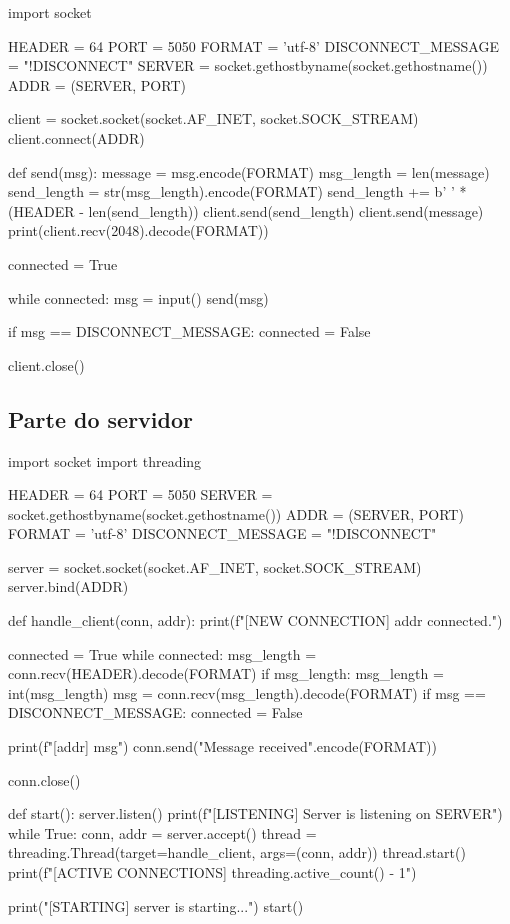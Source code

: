 	\begin{pycode}
		import socket
		
		HEADER = 64
		PORT = 5050
		FORMAT = 'utf-8'
		DISCONNECT_MESSAGE = "!DISCONNECT"
		SERVER = socket.gethostbyname(socket.gethostname())
		ADDR = (SERVER, PORT)
		
		client = socket.socket(socket.AF_INET, socket.SOCK_STREAM)
		client.connect(ADDR)
		
		def send(msg):
		message = msg.encode(FORMAT)
		msg_length = len(message)
		send_length = str(msg_length).encode(FORMAT)
		send_length += b' ' * (HEADER - len(send_length))
		client.send(send_length)
		client.send(message)
		print(client.recv(2048).decode(FORMAT))
		
		connected = True
		
		while connected:
		msg = input()
		send(msg)
		
		if msg == DISCONNECT_MESSAGE:
		connected = False
		
		client.close()
	\end{pycode}
	
	\subsection*{Parte do servidor}
	
	\begin{pycode}
		import socket
		import threading
		
		HEADER = 64
		PORT = 5050
		SERVER = socket.gethostbyname(socket.gethostname())
		ADDR = (SERVER, PORT)
		FORMAT = 'utf-8'
		DISCONNECT_MESSAGE = "!DISCONNECT"
		
		server = socket.socket(socket.AF_INET, socket.SOCK_STREAM)
		server.bind(ADDR)
		
		def handle_client(conn, addr):
		print(f"[NEW CONNECTION] {addr} connected.")
		
		connected = True
		while connected:
		msg_length = conn.recv(HEADER).decode(FORMAT)
		if msg_length:
		msg_length = int(msg_length)
		msg = conn.recv(msg_length).decode(FORMAT)
		if msg == DISCONNECT_MESSAGE:
		connected = False
		
		print(f"[{addr}] {msg}")
		conn.send("Message received".encode(FORMAT))
		
		conn.close()
		
		def start():
		server.listen()
		print(f"[LISTENING] Server is listening on {SERVER}")
		while True:
		conn, addr = server.accept()
		thread = threading.Thread(target=handle_client, args=(conn, addr))
		thread.start()
		print(f"[ACTIVE CONNECTIONS] {threading.active_count() - 1}")
		
		print("[STARTING] server is starting...")
		start()
	\end{pycode}
	
